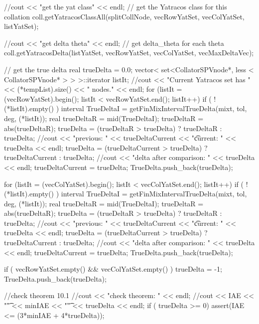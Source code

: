 \begin{DoxyCode}
{{{        //cout << "get the yat class" << endl;
        // get the Yatracos class for this collation
        coll.getYatracosClassAll(splitCollNode, vecRowYatSet,
                            vecColYatSet, listYatSet);

        //cout << "get delta theta" << endl;
        // get delta_theta for each theta
        coll.getYatracosDelta(listYatSet, vecRowYatSet, vecColYatSet, 
                        vecMaxDeltaVec);

        // get the true delta
        real trueDelta = 0.0;
        vector< set<CollatorSPVnode*, less < CollatorSPVnode* > > >::iterator 
      listIt;   
        //cout << "Current Yatracos set has " << (*tempList).size() << "
       nodes." << endl;
        for (listIt = (vecRowYatSet).begin(); listIt < vecRowYatSet.end(); 
      listIt++) {
          if ( !(*listIt).empty() ) {
              interval TrueDeltaI = getFinMixIntervalTrueDelta(mixt, tol, deg, 
      (*listIt));
              real trueDeltaR = mid(TrueDeltaI);
              trueDeltaR = abs(trueDeltaR);
              trueDelta = (trueDeltaR > trueDelta) ? trueDeltaR : trueDelta;
              //cout << "previous: " << trueDeltaCurrent << "\t current: " <<
       trueDelta << endl;
              trueDelta = (trueDeltaCurrent > trueDelta) ? trueDeltaCurrent : 
      trueDelta;
              //cout << "delta after comparison: " << trueDelta << endl;
              trueDeltaCurrent = trueDelta;
              TrueDelta.push_back(trueDelta);
            }
          }

          for (listIt = (vecColYatSet).begin(); listIt < vecColYatSet.end(); 
      listIt++) {
            if ( !(*listIt).empty() ) {
              interval TrueDeltaI = getFinMixIntervalTrueDelta(mixt, tol, deg, 
      (*listIt));
              real trueDeltaR = mid(TrueDeltaI);
              trueDeltaR = abs(trueDeltaR);
              trueDelta = (trueDeltaR > trueDelta) ? trueDeltaR : trueDelta;
              //cout << "previous: " << trueDeltaCurrent << "\t current: " <<
       trueDelta << endl;
              trueDelta = (trueDeltaCurrent > trueDelta) ? trueDeltaCurrent : 
      trueDelta;
              //cout << "delta after comparison: " << trueDelta << endl;
              trueDeltaCurrent = trueDelta;
              TrueDelta.push_back(trueDelta);
            }
          }

        if ( vecRowYatSet.empty() && vecColYatSet.empty() ) 
        { trueDelta = -1; TrueDelta.push_back(trueDelta); } 
        
        //check theorem 10.1
        //cout << "check theorem: " << endl;
        //cout << IAE << "\t" << minIAE << "\t" << trueDelta << endl;
        if ( trueDelta >= 0) {  assert(IAE <= (3*minIAE + 4*trueDelta)); }

}}}
\end{DoxyCode}
